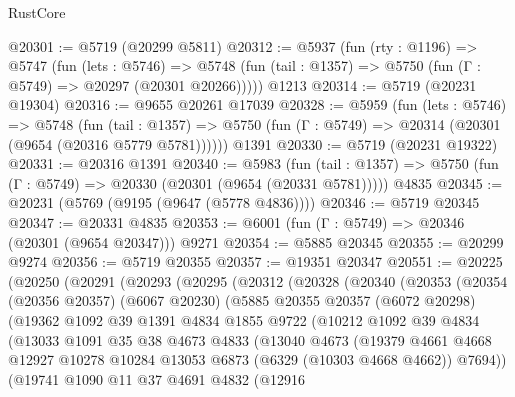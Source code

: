 \begin{lexlean}{RustCore}
\begin{coremodule}
@20301 := @5719 (@20299 @5811)
@20312 := @5937
    (fun (rty : @1196) =>
    @5747
      (fun (lets : @5746) =>
      @5748 (fun (tail : @1357) => @5750 (fun (Γ : @5749) => @20297 (@20301 @20266)))))
    @1213
@20314 := @5719 (@20231 @19304)
@20316 := @9655 @20261 @17039
@20328 := @5959
    (fun (lets : @5746) =>
    @5748
      (fun (tail : @1357) =>
      @5750 (fun (Γ : @5749) => @20314 (@20301 (@9654 (@20316 @5779 @5781))))))
    @1391
@20330 := @5719 (@20231 @19322)
@20331 := @20316 @1391
@20340 := @5983
    (fun (tail : @1357) => @5750 (fun (Γ : @5749) => @20330 (@20301 (@9654 (@20331 @5781)))))
    @4835
@20345 := @20231 (@5769 (@9195 (@9647 (@5778 @4836))))
@20346 := @5719 @20345
@20347 := @20331 @4835
@20353 := @6001 (fun (Γ : @5749) => @20346 (@20301 (@9654 @20347))) @9271
@20354 := @5885 @20345
@20355 := @20299 @9274
@20356 := @5719 @20355
@20357 := @19351 @20347
@20551 := @20225
    (@20250
      (@20291
        (@20293
          (@20295
            (@20312
              (@20328
                (@20340
                  (@20353
                    (@20354
                      (@20356 @20357)
                      (@6067 @20230)
                      (@5885
                        @20355
                        @20357
                        (@6072 @20298)
                        (@19362
                          @1092
                          @39
                          @1391
                          @4834
                          @1855
                          @9722
                          (@10212
                            @1092
                            @39
                            @4834
                            (@13033
                              @1091
                              @35
                              @38
                              @4673
                              @4833
                              (@13040
                                @4673
                                (@19379
                                  @4661
                                  @4668
                                  @12927
                                  @10278
                                  @10284
                                  @13053
                                  @6873
                                  (@6329 (@10303 @4668 @4662))
                                  @7694))
                              (@19741
                                @1090
                                @11
                                @37
                                @4691
                                @4832
                                (@12916

\end{coremodule}
\end{lexlean}
